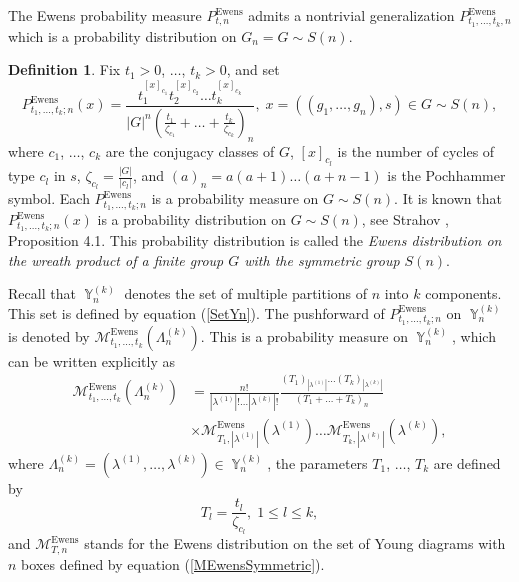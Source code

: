 \documentclass[12pt]{amsart}
\theoremstyle{definition}
\newtheorem{defn}[thm]{Definition}
\numberwithin{equation}{section}
\DeclareMathOperator{\Y}{\mathbb{Y}}
\DeclareMathOperator{\Ewens}{Ewens}
\begin{document}
The Ewens probability measure $P_{t,n}^{\Ewens}$ admits a nontrivial generalization
$P_{t_1,\ldots,t_k,n}^{\Ewens}$ which is a probability distribution on $G_n=G\sim S(n)$.
\begin{defn} Fix $t_1>0$, $\ldots$, $t_k>0$, and set
\begin{equation}\label{EwensMeasureWreathProduct}
P_{t_1,\ldots,t_k;n}^{\Ewens}(x)=\frac{t_1^{[x]_{c_1}}t_2^{[x]_{c_2}}\ldots t_k^{[x]_{c_k}}}{
|G|^n\left(\frac{t_1}{\zeta_{c_1}}+\ldots+\frac{t_k}{\zeta_{c_k}}\right)_n},\;
x=\left((g_1,\ldots,g_n),s\right)\in G\sim S(n),
\end{equation}
where $c_1$, $\ldots$, $c_k$ are the conjugacy classes of $G$, $[x]_{c_l}$ is the number of cycles of type $c_l$ in $s$, $\zeta_{c_l}=\frac{|G|}{|c_l|}$, and $(a)_n=a(a+1)\ldots (a+n-1)$ is the Pochhammer symbol. Each
$P_{t_1,\ldots,t_k;n}^{\Ewens}$ is a probability measure on $G\sim S(n)$. It is known that
$P_{t_1,\ldots,t_k;n}^{\Ewens}(x)$ is a probability distribution on $G\sim S(n)$,
see Strahov \cite{StrahovMPS},  Proposition 4.1. This probability distribution  is called the \textit{ Ewens distribution on the wreath product of a finite group $G$ with the symmetric group $S(n)$}.
\end{defn}
Recall that $\Y_n^{(k)}$ denotes the set of  multiple partitions of $n$ into $k$ components. This set is defined by equation (\ref{SetYn}).
The pushforward of $P_{t_1,\ldots,t_k; n}^{\Ewens}$ on $\Y_n^{(k)}$ is denoted by $\mathcal{M}_{t_1,\ldots,t_k}^{\Ewens}\left(\Lambda_n^{(k)}\right)$.
This is a probability measure on $\Y_n^{(k)}$, which can be written explicitly as
\begin{equation}
\begin{split}
\mathcal{M}_{t_1,\ldots,t_k}^{\Ewens}\left(\Lambda_n^{(k)}\right)
&=\frac{n!}{|\lambda^{(1)}|!\ldots |\lambda^{(k)}|!}
\frac{\left(T_1\right)_{|\lambda^{(1)}|}
\ldots\left(T_k\right)_{|\lambda^{(k)}|}}{\left(T_1+\ldots+T_k\right)_n}\\
&\times
\mathcal{M}_{T_1,|\lambda^{(1)}|}^{\Ewens}\left(\lambda^{(1)}\right)\ldots
\mathcal{M}_{T_k,|\lambda^{(k)}|}^{\Ewens}\left(\lambda^{(k)}\right),
\end{split}
\end{equation}
where $\Lambda_n^{(k)}=\left(\lambda^{(1)},\ldots,\lambda^{(k)}\right)\in\Y_n^{(k)}$, the parameters
$T_1$, $\ldots$, $T_k$ are defined by
\begin{equation}\label{5.4.a}
T_l=\frac{t_l}{\zeta_{c_l}},\; 1\leq l\leq k,
\end{equation}
and $\mathcal{M}_{T, n}^{\Ewens}$ stands for the Ewens distribution on the set of Young diagrams with $n$ boxes defined by equation (\ref{MEwensSymmetric}).
\end{document}
